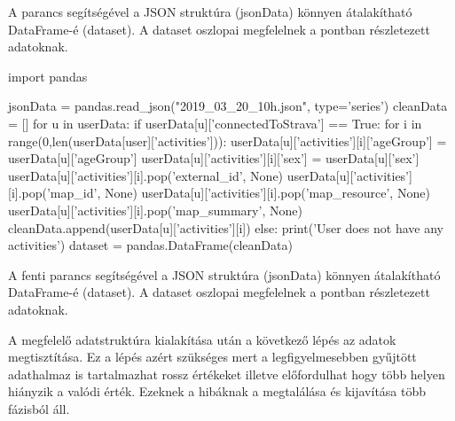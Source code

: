 \begin{programreszlet}
A  parancs segítségével a JSON struktúra (jsonData) könnyen átalakítható DataFrame-é (dataset). A dataset oszlopai megfelelnek a  pontban részletezett adatoknak.
\begin{python}
import pandas

jsonData = pandas.read_json("2019_03_20_10h.json", type='series')
cleanData = []
for u in userData:
  if userData[u]['connectedToStrava'] == True:
    for i in range(0,len(userData[user]['activities'])):
       userData[u]['activities'][i]['ageGroup'] = userData[u]['ageGroup']
       userData[u]['activities'][i]['sex'] = userData[u]['sex']
       userData[u]['activities'][i].pop('external_id', None)
       userData[u]['activities'][i].pop('map_id', None)
       userData[u]['activities'][i].pop('map_resource', None)
       userData[u]['activities'][i].pop('map_summary', None)
       cleanData.append(userData[u]['activities'][i]) 
  else:
    print('User does not have any activities')
dataset = pandas.DataFrame(cleanData)

\end{python}
\end{programreszlet}


A fenti parancs segítségével a JSON struktúra (jsonData) könnyen átalakítható DataFrame-é (dataset). A dataset oszlopai megfelelnek a  pontban részletezett adatoknak.


A megfelelő adatstruktúra kialakítása után a következő lépés az adatok megtisztítása. Ez a lépés azért szükséges mert a legfigyelmesebben gyűjtött adathalmaz is tartalmazhat rossz értékeket illetve előfordulhat hogy több helyen hiányzik a valódi érték. Ezeknek a hibáknak a megtalálása és kijavítása több fázisból áll.

